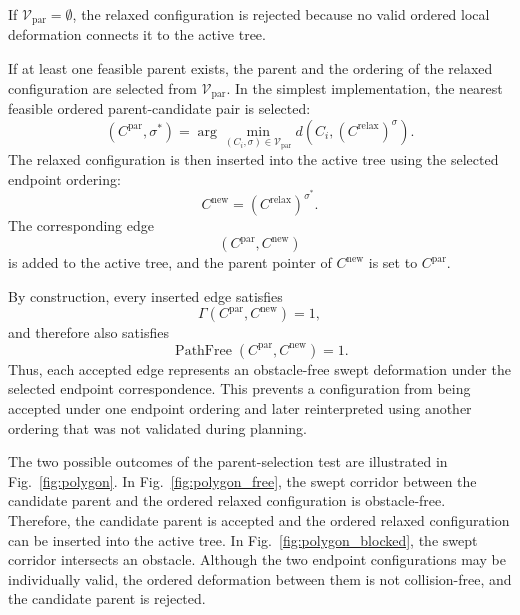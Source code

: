 \documentclass{pas}
\begin{document}
If \(\mathcal{V}_{\mathrm{par}}=\emptyset\), the relaxed configuration is
rejected because no valid ordered local deformation connects it to the active
tree.

If at least one feasible parent exists, the parent and the ordering of the
relaxed configuration are selected from \(\mathcal{V}_{\mathrm{par}}\). In the
simplest implementation, the nearest feasible ordered parent-candidate pair is
selected:
\begin{equation}
\left(
C^{\mathrm{par}},
\sigma^{\ast}
\right)
=
\arg\min_{\left(C_i,\sigma\right)\in\mathcal{V}_{\mathrm{par}}}
d
\left(
C_i,
\left(C^{\mathrm{relax}}\right)^{\sigma}
\right).
\label{eq:selected_parent_nearest}
\end{equation}
The relaxed configuration is then inserted into the active tree using the
selected endpoint ordering:
\begin{equation}
C^{\mathrm{new}}
=
\left(C^{\mathrm{relax}}\right)^{\sigma^{\ast}}.
\label{eq:new_node_is_relaxed}
\end{equation}
The corresponding edge
\begin{equation}
\left(
C^{\mathrm{par}},C^{\mathrm{new}}
\right)
\label{eq:new_tree_edge}
\end{equation}
is added to the active tree, and the parent pointer of \(C^{\mathrm{new}}\) is
set to \(C^{\mathrm{par}}\).

By construction, every inserted edge satisfies
\begin{equation}
\Gamma
\left(
C^{\mathrm{par}},
C^{\mathrm{new}}
\right)
=
1 ,
\label{eq:inserted_edge_gamma_valid}
\end{equation}
and therefore also satisfies
\begin{equation}
\operatorname{PathFree}
\left(
C^{\mathrm{par}},
C^{\mathrm{new}}
\right)
=
1 .
\label{eq:inserted_edge_pathfree_valid}
\end{equation}
Thus, each accepted edge represents an obstacle-free swept deformation under the
selected endpoint correspondence. This prevents a configuration from being
accepted under one endpoint ordering and later reinterpreted using another
ordering that was not validated during planning.

The two possible outcomes of the parent-selection test are illustrated in
Fig.~\ref{fig:polygon}. In Fig.~\ref{fig:polygon_free}, the swept corridor
between the candidate parent and the ordered relaxed configuration is
obstacle-free. Therefore, the candidate parent is accepted and the ordered
relaxed configuration can be inserted into the active tree. In
Fig.~\ref{fig:polygon_blocked}, the swept corridor intersects an obstacle.
Although the two endpoint configurations may be individually valid, the ordered
deformation between them is not collision-free, and the candidate parent is
rejected.
\end{document}
